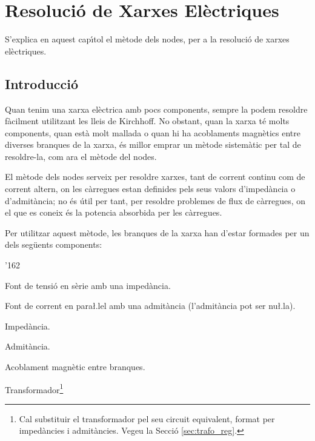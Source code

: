 \chapter{Resoluci\'{o} de Xarxes El\`{e}ctriques} \label{chap:nusos}

S'explica en aquest cap\'{\i}tol el m\`{e}tode dels
nodes, per a la resoluci\'{o} de xarxes el\`{e}ctriques.

\section{Introducci\'{o}}

Quan tenim una xarxa el\`{e}ctrica amb pocs components, sempre la podem resoldre f\`{a}cilment
utilitzant les lleis de Kirchhoff. No obstant, quan la xarxa t\'{e} molts components, quan est\`{a}
 molt mallada o quan hi ha acoblaments magn\`{e}tics entre diverses branques de la xarxa, \'{e}s millor
 emprar un m\`{e}tode sistem\`{a}tic per tal de resoldre-la, com ara el m\`{e}tode del nodes.

El m\`{e}tode dels nodes serveix per resoldre xarxes, tant de corrent continu com de corrent altern, on
les c\`{a}rregues estan definides pels seus valors d'imped\`{a}ncia o d'admit\`{a}ncia; no \'{e}s \'{u}til per tant, per
resoldre problemes de flux de c\`{a}rregues, on el que es coneix \'{e}s la potencia absorbida per les
c\`{a}rregues.

Per utilitzar aquest m\`{e}tode, les branques de la xarxa han d'estar formades per un dels
seg\"{u}ents components:
\begin{dinglist}{'162}
   \item Font de tensi\'{o} en s\`{e}rie amb una imped\`{a}ncia.
   \item Font de corrent en para{\l.l}el amb una admit\`{a}ncia (l'admit\`{a}ncia pot ser nu{\l.l}a).
   \item Imped\`{a}ncia.
   \item Admit\`{a}ncia.
   \item Acoblament magn\`{e}tic entre branques.
   \item Transformador\footnote{Cal substituir el transformador pel seu circuit equivalent, format per imped\`{a}ncies i
   admit\`{a}ncies. Vegeu la Secci\'{o} \ref{sec:trafo_reg}.}
\end{dinglist}

